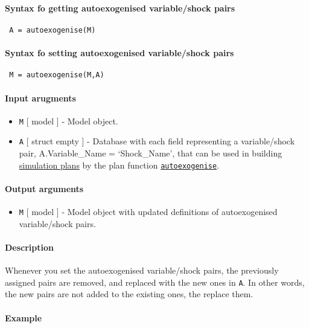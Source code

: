 


	\paragraph{Syntax fo getting autoexogenised variable/shock pairs}
 
 \begin{verbatim}
 A = autoexogenise(M)
 \end{verbatim}
 
 \paragraph{Syntax fo setting autoexogenised variable/shock pairs}
 
 \begin{verbatim}
 M = autoexogenise(M,A)
 \end{verbatim}
 
 \paragraph{Input arugments}
 
 \begin{itemize}
 \item
   \texttt{M} {[} model {]} - Model object.
 \item
   \texttt{A} {[} struct \textbar{} empty {]} - Database with each field
   representing a variable/shock pair, A.Variable\_Name = `Shock\_Name',
   that can be used in building \href{plan/Contents}{simulation plans} by
   the plan function \href{plan/autoexogenise}{\texttt{autoexogenise}}.
 \end{itemize}
 
 \paragraph{Output arguments}
 
 \begin{itemize}
 \item
   \texttt{M} {[} model {]} - Model object with updated definitions of
   autoexogenised variable/shock pairs.
 \end{itemize}
 
 \paragraph{Description}
 
 Whenever you set the autoexogenised variable/shock pairs, the previously
 assigned pairs are removed, and replaced with the new ones in
 \texttt{A}. In other words, the new pairs are not added to the existing
 ones, the replace them.
 
 \paragraph{Example}


